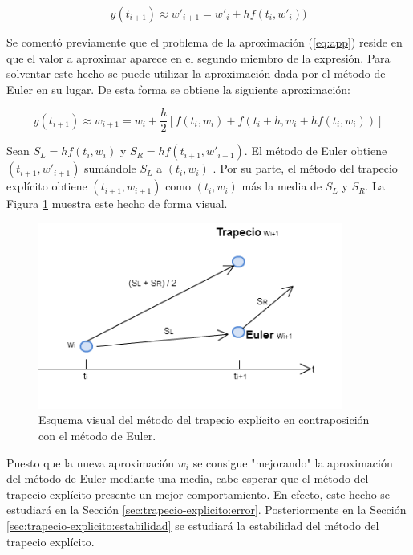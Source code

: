 \documentclass{article}
\theoremstyle{theorem-style}  %
\theoremstyle{definition-style}
\theoremstyle{example-style}
\begin{document}
		\begin{equation*} \label{eq:euler}
			y(t_{i+1}) \approx w'_{i+1} = w'_i + h f(t_i,w'_i))
		\end{equation*}

		Se comentó previamente que el problema de la aproximación (\ref{eq:app}) reside en que el valor a aproximar aparece en el segundo miembro de la expresión. Para solventar este hecho se puede utilizar la aproximación dada por el método de Euler en su lugar. De esta forma se obtiene la siguiente aproximación:

		\begin{equation} \label{eq:app-exp}
			y(t_{i+1}) \approx w_{i+1} = w_i + \frac{h}{2} \left[f(t_i,w_i) + f(t_{i}+h, w_i + h f(t_i,w_i))\right]
		\end{equation}

		Sean $S_L = h f(t_i,w_i) $ y $S_R = h f(t_{i+1}, w'_{i+1})$. El método de Euler  obtiene $(t_{i+1}, w'_{i+1})$ sumándole $S_L$ a $(t_{i}, w_{i})$ . Por su parte, el método del trapecio explícito obtiene $(t_{i+1}, w_{i+1})$ como $(t_{i}, w_{i})$ más la media de $S_L$ y $S_R$. La Figura \ref{fig:trapecio-vs-euler} muestra este hecho de forma visual.
			
		\begin{figure}[H]
			\centering
			\includegraphics[width=10cm]{./Images/trapecio-vs-euler.png}
			\caption{Esquema visual del método del trapecio explícito en contraposición con el método de Euler.} 
			\label{fig:trapecio-vs-euler}
		\end{figure}

		Puesto que la nueva aproximación $w_i$ se consigue "mejorando" la aproximación del método de Euler mediante una media, cabe esperar que el método del trapecio explícito presente un mejor comportamiento. En efecto, este hecho se estudiará en la Sección \ref{sec:trapecio-explicito:error}. Posteriormente en la Sección \ref{sec:trapecio-explicito:estabilidad} se estudiará la estabilidad del método del trapecio explícito. 
\end{document}
